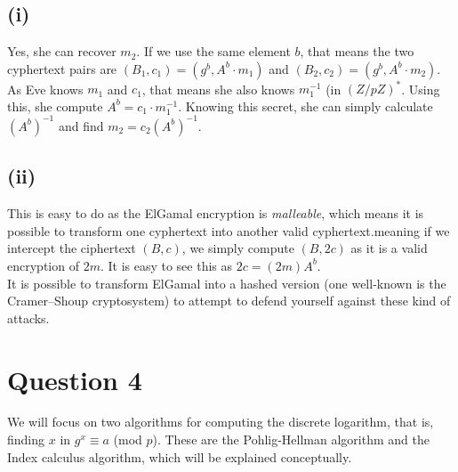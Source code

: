 \documentclass[a4paper, fleqn]{article}
\begin{document}
\subsection{(i)}
Yes, she can recover $m_2$. If we use the same element $b$, that means the two cyphertext pairs are $(B_1, c_1) = (g^b, A^b\cdot m_1)$ and $(B_2, c_2)=(g^b, A^b\cdot m_2)$. As Eve knows $m_1$ and $c_1$, that means she also knows $m_1^{-1}$ (in $(Z/pZ)^*$. Using this, she compute $A^b=c_1\cdot m_1^{-1}$. Knowing this secret, she can simply calculate $(A^b)^{-1}$ and find $m_2=c_2(A^b)^{-1}$.

\subsection{(ii)}
This is easy to do as the ElGamal encryption is \textit{malleable}, which means it is possible to transform one cyphertext into another valid cyphertext.meaning if we intercept the ciphertext $(B, c)$, we simply compute $(B, 2c)$ as it is a valid encryption of $2m$. It is easy to see this as $2c=(2m)A^b$. \\
It is possible to transform ElGamal into a hashed version (one well-known is the Cramer–Shoup cryptosystem) to attempt to defend yourself against these kind of attacks.

\section{Question 4}
We will focus on two algorithms for computing the discrete logarithm, that is, finding $x$ in $g^x\equiv a$ (mod $p$). These are the Pohlig-Hellman algorithm and the Index calculus algorithm, which will be explained conceptually.
\end{document}
